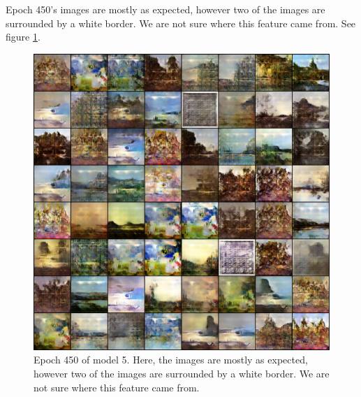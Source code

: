 \documentclass[11pt,letterpaper]{article}
\begin{document}
				Epoch 450's images are mostly as expected, however two of the images are surrounded by a white border.
				We are not sure where this feature came from.
				See figure \ref{fig:wa128:epoch450generator}.
				\begin{figure}
					\centering
					\includegraphics[width=1.0\linewidth]{results/model5/epoch450_generator}
					\caption{Epoch 450 of model 5. Here, the images are mostly as expected, however two of the images are surrounded by a white border. We are not sure where this feature came from.}
					\label{fig:wa128:epoch450generator}
				\end{figure}
\end{document}
